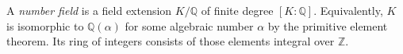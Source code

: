 
A \emph{number field} is a field extension $K/\mathbb Q$ of finite degree $[K:\mathbb Q]$. Equivalently, $K$ is isomorphic to $\mathbb Q(\alpha)$ for some algebraic number $\alpha$ by the primitive element theorem. Its ring of integers consists of those elements integral over $\mathbb Z$.

